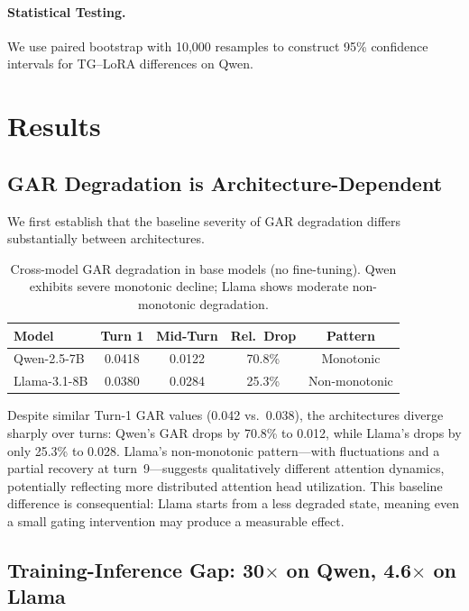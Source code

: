 \documentclass[11pt,a4paper]{article}
\begin{document}
\paragraph{Statistical Testing.}
We use paired bootstrap with 10,000 resamples to construct 95\% confidence intervals for TG--LoRA differences on Qwen.

\section{Results}
\label{sec:results}

\subsection{GAR Degradation is Architecture-Dependent}
\label{sec:gar_degradation}

We first establish that the baseline severity of GAR degradation differs substantially between architectures.

\begin{table}[h]
\centering
\small
\caption{Cross-model GAR degradation in base models (no fine-tuning). Qwen exhibits severe monotonic decline; Llama shows moderate non-monotonic degradation.}
\label{tab:gar_degradation}
\begin{tabular}{lcccc}
\toprule
\textbf{Model} & \textbf{Turn 1} & \textbf{Mid-Turn} & \textbf{Rel.\ Drop} & \textbf{Pattern} \\
\midrule
Qwen-2.5-7B & 0.0418 & 0.0122 & 70.8\% & Monotonic \\
Llama-3.1-8B & 0.0380 & 0.0284 & 25.3\% & Non-monotonic \\
\bottomrule
\end{tabular}
\end{table}

Despite similar Turn-1 GAR values (0.042 vs.\ 0.038), the architectures diverge sharply over turns: Qwen's GAR drops by 70.8\% to 0.012, while Llama's drops by only 25.3\% to 0.028.
Llama's non-monotonic pattern---with fluctuations and a partial recovery at turn~9---suggests qualitatively different attention dynamics, potentially reflecting more distributed attention head utilization.
This baseline difference is consequential: Llama starts from a less degraded state, meaning even a small gating intervention may produce a measurable effect.

\subsection{Training-Inference Gap: 30$\times$ on Qwen, 4.6$\times$ on Llama}
\label{sec:gap}
\end{document}
